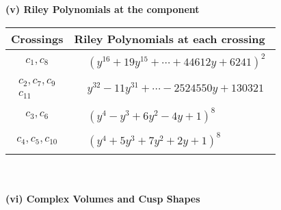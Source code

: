 \documentclass[1p]{elsarticle_modified}
\theoremstyle{definition}
\begin{document}
\newpage\renewcommand{\arraystretch}{1}
\flushleft \textbf{(v) Riley Polynomials at the component}\newline \\
\begin{tabular}{m{50pt}|m{274pt}}
Crossings & \hspace{64pt}Riley Polynomials at each crossing \\
\hline $$\begin{aligned}c_{1},c_{8}\end{aligned}$$&$\begin{aligned}
&(y^{16}+19 y^{15}+\cdots+44612 y+6241)^{2}
\end{aligned}$\\
\hline $$\begin{aligned}c_{2},c_{7},c_{9}\\c_{11}\end{aligned}$$&$\begin{aligned}
&y^{32}-11 y^{31}+\cdots-2524550 y+130321
\end{aligned}$\\
\hline $$\begin{aligned}c_{3},c_{6}\end{aligned}$$&$\begin{aligned}
&(y^4- y^3+6 y^2-4 y+1)^8
\end{aligned}$\\
\hline $$\begin{aligned}c_{4},c_{5},c_{10}\end{aligned}$$&$\begin{aligned}
&(y^4+5 y^3+7 y^2+2 y+1)^8
\end{aligned}$\\
\hline
\end{tabular}\\~\\
\newpage\flushleft \textbf{(vi) Complex Volumes and Cusp Shapes}
\end{document}
